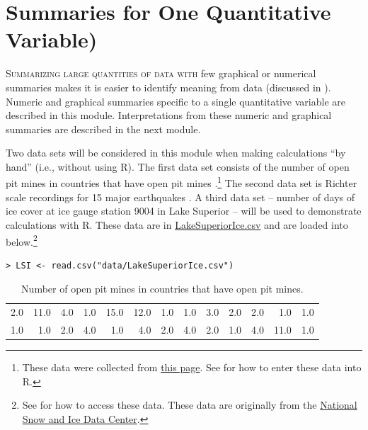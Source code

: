 \documentclass[10pt,openany]{book}\usepackage[]{graphicx}\usepackage[]{color}
\makeatletter
\newenvironment{kframe}{%
 \def\at@end@of@kframe{}%
 \ifinner\ifhmode%
  \def\at@end@of@kframe{\end{minipage}}%
  \begin{minipage}{\columnwidth}%
 \fi\fi%
 \def\FrameCommand##1{\hskip\@totalleftmargin \hskip-\fboxsep
 \colorbox{shadecolor}{##1}\hskip-\fboxsep
     \hskip-\linewidth \hskip-\@totalleftmargin \hskip\columnwidth}%
 \MakeFramed {\advance\hsize-\width
   \@totalleftmargin\z@ \linewidth\hsize
   \@setminipage}}%
 {\par\unskip\endMakeFramed%
 \at@end@of@kframe}
\newenvironment{knitrout}{}{} %
\makeatother
\begin{document}
\chapter[Summary One Quant Var]{Summaries for One Quantitative Variable)} \label{chap:UnivEDAQuant1}

\vspace{-48pt}
\minitoc
\vspace{12pt}

\lettrine{S}{ummarizing large quantities of data with} few graphical or numerical summaries makes it is easier to identify meaning from data (discussed in ). Numeric and graphical summaries specific to a single quantitative variable are described in this module. Interpretations from these numeric and graphical summaries are described in the next module.

Two data sets will be considered in this module when making calculations ``by hand'' (i.e., without using R). The first data set consists of the number of open pit mines in countries that have open pit mines .\footnote{These data were collected from \href{https://en.wikipedia.org/wiki/List_of_open-pit_mines}{this page}. See  for how to enter these data into R.} The second data set is Richter scale recordings for 15 major earthquakes . A third data set -- number of days of ice cover at ice gauge station 9004 in Lake Superior -- will be used to demonstrate calculations with R. These data are in \href{https://raw.githubusercontent.com/droglenc/NCData/master/LakeSuperiorIce.csv}{LakeSuperiorIce.csv} and are loaded into  below.\footnote{See  for how to access these data. These data are originally from the \href{http://www.nsidc.org/}{National Snow and Ice Data Center}.}
\begin{knitrout}
\color{fgcolor}\begin{kframe}
\begin{verbatim}
> LSI <- read.csv("data/LakeSuperiorIce.csv")
\end{verbatim}
\end{kframe}
\end{knitrout}


\begin{table}[ht]
\centering
\caption{Number of open pit mines in countries that have open pit mines.} 
\label{tab:MineData}
\begin{tabular}{rrrrrrrrrrrrr}
   \hline
2.0 & 11.0 & 4.0 & 1.0 & 15.0 & 12.0 & 1.0 & 1.0 & 3.0 & 2.0 & 2.0 & 1.0 & 1.0 \\ 
  1.0 & 1.0 & 2.0 & 4.0 & 1.0 & 4.0 & 2.0 & 4.0 & 2.0 & 1.0 & 4.0 & 11.0 & 1.0 \\ 
   \hline
\end{tabular}
\end{table}
\end{document}
